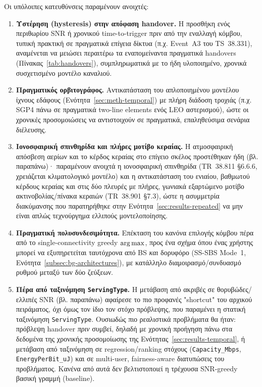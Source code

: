Οι υπόλοιπες κατευθύνσεις παραμένουν ανοιχτές:

\begin{enumerate}
  \item \textbf{Υστέρηση (hysteresis) στην απόφαση handover.} Η προσθήκη
    ενός περιθωρίου SNR ή χρονικού time-to-trigger πριν από την εναλλαγή
    κόμβου, τυπική πρακτική σε πραγματικά επίγεια δίκτυα (π.χ. Event~A3
    του TS~38.331), αναμένεται να μειώσει περαιτέρω τα εναπομείναντα
    πραγματικά handovers (Πίνακας~\ref{tab:handovers}), συμπληρωματικά με
    το ήδη υλοποιημένο, χρονικά συσχετισμένο μοντέλο καναλιού.
  \item \textbf{Πραγματικός ορβιτογράφος.} Αντικατάσταση του απλοποιημένου
    μοντέλου ίχνους εδάφους (Ενότητα~\ref{sec:meth-temporal}) με πλήρη
    διάδοση τροχιάς (π.χ. SGP4 πάνω σε πραγματικά two-line elements ενός
    LEO αστερισμού), ώστε οι χρονικές προσομοιώσεις να αντιστοιχούν σε
    πραγματικά, επαληθεύσιμα σενάρια διέλευσης.
  \item \textbf{Ιονοσφαιρική σπινθηρίδα και πλήρες μοτίβο κεραίας.} Η
    ατμοσφαιρική απόσβεση αερίων και το κέρδος κεραίας στο επίγειο σκέλος
    προστέθηκαν ήδη (βλ. παραπάνω)· παραμένουν ανοιχτά η ιονοσφαιρική
    σπινθηρίδα (TR~38.811 §6.6.6, χρειάζεται κλιματολογικό μοντέλο) και
    η αντικατάσταση του ενιαίου, βαθμωτού κέρδους κεραίας και στις δύο
    πλευρές με πλήρες, γωνιακά εξαρτώμενο μοτίβο ακτινοβολίας/πίνακα
    κεραιών (TR~38.901 §7.3), ώστε η ασυμμετρία διακύμανσης που
    παρατηρήθηκε στην Ενότητα~\ref{sec:results-repeated} να μην είναι
    απλώς τεχνούργημα ελλιπούς μοντελοποίησης.
  \item \textbf{Πραγματική πολυσυνδεσιμότητα.} Επέκταση του κανόνα
    επιλογής κόμβου πέρα από το single-connectivity greedy $\operatorname*{arg\,max}$, προς
    ένα σχήμα όπου ένας χρήστης μπορεί να εξυπηρετείται ταυτόχρονα από BS
    \emph{και} δορυφόρο (SS-SBS Mode~1, Ενότητα~\ref{subsec:bg-architectures}),
    με κατάλληλο διαμοιρασμό/συνδυασμό ρυθμού μεταξύ των δύο ζεύξεων.
  \item \textbf{Πέρα από ταξινόμηση \texttt{ServingType}.} Η μετάβαση από
    ακριβές σε θορυβώδες/ελλιπές SNR (βλ. παραπάνω) αφαίρεσε το πιο
    προφανές "shortcut" του αρχικού πειράματος, όχι όμως τον ίδιο τον
    στόχο πρόβλεψης, που παραμένει η στατική ταξινόμηση
    \texttt{ServingType}. Ουσιωδώς πιο ρεαλιστικά προβλήματα θα ήταν:
    πρόβλεψη handover \emph{πριν} συμβεί, δηλαδή με χρονική προήγηση πάνω
    στα δεδομένα της χρονικής προσομοίωσης της
    Ενότητας~\ref{sec:results-temporal}, ή μετάβαση από ταξινόμηση σε
    regression/ranking στόχους (\texttt{Capacity\_Mbps},
    \texttt{EnergyPerBit\_uJ}) και σε multi-user, fairness-aware
    διατυπώσεις του προβλήματος. Κανένα από αυτά δεν βελτιστοποιεί η
    τρέχουσα SNR-greedy βασική γραμμή (baseline).
\end{enumerate}

